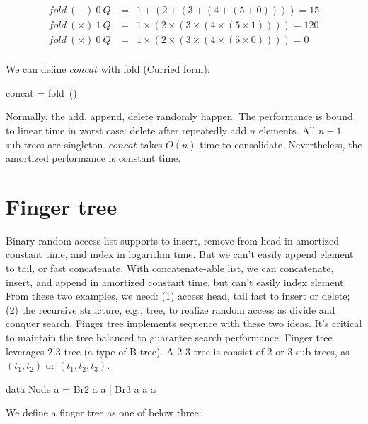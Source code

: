 \documentclass[b5paper]{article}
\begin{document}
\[
\begin{array}{rcl}
fold\ (+)\ 0\ Q & = & 1 + (2 + (3 + (4 + (5 + 0)))) = 15 \\
fold\ (\times)\ 1\ Q\ & = & 1 \times (2 \times (3 \times (4 \times (5 \times 1)))) = 120 \\
fold\ (\times)\ 0\ Q & = & 1 \times (2 \times (3 \times (4 \times (5 \times 0)))) = 0 \\
\end{array}
\]

We can define $concat$ with fold (Curried form):

\be
concat = fold\ (\doubleplus)\ \nil
\ee

Normally, the add, append, delete randomly happen. The performance is bound to linear time in worst case: delete after repeatedly add $n$ elements. All $n-1$ sub-trees are singleton. $concat$ takes $O(n)$ time to consolidate. Nevertheless, the amortized performance is constant time.


\section{Finger tree}
 \label{sec:finger-tree}

Binary random access list supports to insert, remove from head in amortized constant time, and index in logarithm time. But we can't easily append element to tail, or fast concatenate. With concatenate-able list, we can concatenate, insert, and append in amortized constant time, but can't easily index element. From these two examples, we need: (1) access head, tail fast to insert or delete; (2) the recursive structure, e.g., tree, to realize random access as divide and conquer search. Finger tree\cite{finger-tree-1977} implements sequence with these two ideas\cite{finger-tree-2006}. It's critical to maintain the tree balanced to guarantee search performance. Finger tree leverages 2-3 tree (a type of B-tree). A 2-3 tree is consist of 2 or 3 sub-trees, as $(t_1, t_2)$ or $(t_1, t_2, t_3)$.

\lstset{frame = single}
\begin{Haskell}
data Node a = Br2 a a | Br3 a a a
\end{Haskell}

We define a finger tree as one of below three:
\end{document}
